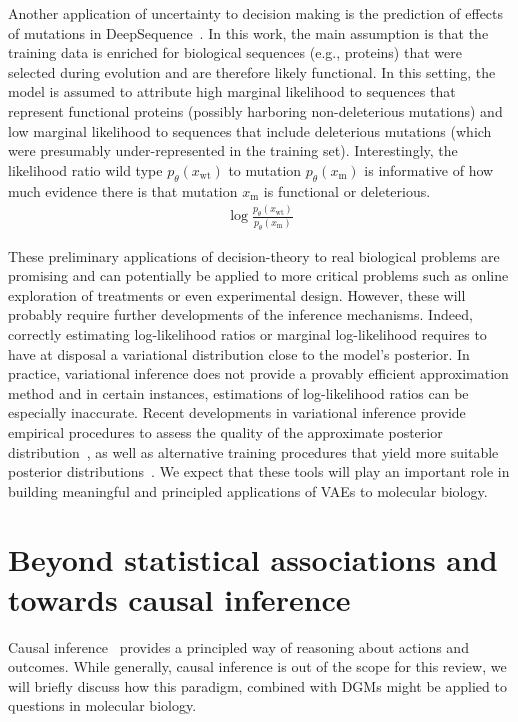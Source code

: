Another application of uncertainty to decision making is the prediction of effects of mutations in DeepSequence~\cite{DeepSequence}. In this work, the main assumption is that the training data is enriched for biological sequences (e.g., proteins) that were selected during evolution and are therefore likely functional. In this setting, the model is assumed to attribute high marginal likelihood to sequences that represent functional proteins (possibly harboring non-deleterious mutations) and low marginal likelihood to sequences that include deleterious mutations (which were presumably under-represented in the training set). Interestingly, the likelihood ratio wild type $p_\theta(x_{\textrm{wt}})$ to mutation $p_\theta(x_{\textrm{m}})$ is informative of how much evidence there is that mutation $x_{\textrm{m}}$ is functional or deleterious. 
\begin{align}
    \log \frac{p_\theta(x_{\textrm{wt}})}{p_\theta(x_{\textrm{m}})}
\end{align}

These preliminary applications of decision-theory to real biological problems are promising and can potentially be applied to more critical problems such as online exploration of treatments or even experimental design. However, these will probably require further developments of the inference mechanisms. Indeed, correctly estimating log-likelihood ratios or marginal log-likelihood requires to have at disposal a variational distribution close to the model's posterior. In practice, variational inference does not provide a provably efficient approximation method and in certain instances, estimations of log-likelihood ratios can be especially inaccurate. Recent developments in variational inference provide empirical procedures to assess the quality of the approximate posterior distribution~\cite{yao2018yes}, as well as alternative training procedures that yield more suitable posterior distributions~\cite{le2018revisiting,sbVAE}. We expect that these tools will play an important role in building meaningful and principled applications of VAEs to molecular biology.



\section{Beyond statistical associations and towards causal inference}
\label{box:causal}
Causal inference~\cite{pearl2009causality} provides a principled way of reasoning about actions and outcomes. While generally, causal inference is out of the scope for this review, we will briefly discuss how this paradigm, combined with DGMs might be applied to questions in molecular biology.

